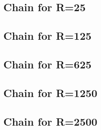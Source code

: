 \subsection{Chain for R=25} %
\label{sec:filter_frequency_responses:chain25}

%
%
\subsection{Chain for R=125} %
\label{sec:filter_frequency_responses:chain125}

%
%
\subsection{Chain for R=625} %
\label{sec:filter_frequency_responses:chain625}

%
%
\subsection{Chain for R=1250} %
\label{sec:filter_frequency_responses:chain1250}

%
%
\subsection{Chain for R=2500} %
\label{sec:filter_frequency_responses:chain2500}


